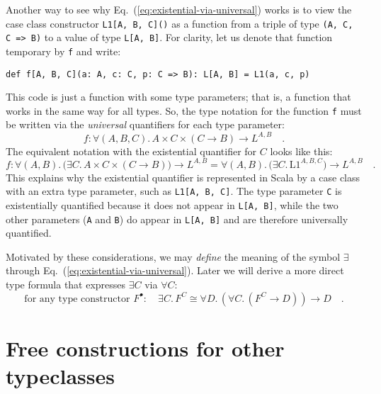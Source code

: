 Another way to see why Eq.~(\ref{eq:existential-via-universal})
works is to view the case class constructor \lstinline!L1[A, B, C]()!
as a function from a triple of type \lstinline!(A, C, C => B)!
to a value of type \lstinline!L[A, B]!.
For clarity, let us denote that function temporary by \lstinline!f!
and write:
\begin{lstlisting}
def f[A, B, C](a: A, c: C, p: C => B): L[A, B] = L1(a, c, p) 
\end{lstlisting}
This code is just a function with some type parameters; that is, a
function that works in the same way for all types. So, the type notation
for the function \lstinline!f!
must be written via the \emph{universal} quantifiers for each type
parameter:
\[
f:\forall(A,B,C).\,A\times C\times(C\rightarrow B)\rightarrow L^{A,B}\quad.
\]
The equivalent notation with the existential quantifier for $C$ looks
like this:
\[
f:\forall(A,B).\,\big(\exists C.\,A\times C\times(C\rightarrow B)\big)\rightarrow L^{A,B}=\forall(A,B).\,\big(\exists C.\,\text{L1}^{A,B,C})\rightarrow L^{A,B}\quad.
\]
This explains why the existential quantifier is represented in Scala
by a case class with an extra type parameter, such as \lstinline!L1[A, B, C]!.
The type parameter \lstinline!C!
is existentially quantified because it does not appear in \lstinline!L[A, B]!,
while the two other parameters (\lstinline!A!
and \lstinline!B!) do appear
in \lstinline!L[A, B]!
and are therefore universally quantified.

Motivated by these considerations, we may \emph{define} the meaning
of the symbol $\exists$ through Eq.~(\ref{eq:existential-via-universal}).
Later we will derive a more direct type formula that expresses $\exists C$
via $\forall C$: 
\[
\text{for any type constructor }F^{\bullet}:\quad\exists C.\,F^{C}\cong\forall D.\,(\forall C.\,(F^{C}\rightarrow D))\rightarrow D\quad.
\]


\section{Free constructions for other typeclasses}

